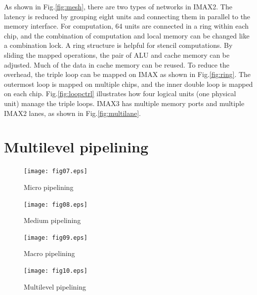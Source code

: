 As shown in Fig.\ref{fig:mesh}, there are two types of networks in
IMAX2. The latency is reduced by grouping eight units and connecting them in
parallel to the memory interface. For computation, 64 units are connected in
a ring within each chip, and the combination of computation and local memory
can be changed like a combination lock.  A ring structure is helpful for
stencil computations. By sliding the mapped operations, the pair of ALU and
cache memory can be adjusted. Much of the data in cache memory can be
reused.  To reduce the overhead, the triple loop can be mapped on IMAX as
shown in Fig.\ref{fig:ring}. The outermost loop is mapped on multiple chips,
and the inner double loop is mapped on each chip. Fig.\ref{fig:loopctrl}
illustrates how four logical units (one physical unit) manage the triple
loops. IMAX3 has multiple memory ports and multiple IMAX2 lanes, as shown
in Fig.\ref{fig:multilane}.

\section{Multilevel pipelining}

\begin{figure}[htbp]
\center
\texttt{[image: fig07.eps]}
\caption{\label{fig:micro}Micro pipelining}
\end{figure}

\begin{figure}[htbp]
\center
\texttt{[image: fig08.eps]}
\caption{\label{fig:medium}Medium pipelining}
\end{figure}

\begin{figure}[htbp]
\center
\texttt{[image: fig09.eps]}
\caption{\label{fig:macro}Macro pipelining}
\end{figure}

\begin{figure}[htbp]
\center
\texttt{[image: fig10.eps]}
\caption{\label{fig:all}Multilevel pipelining}
\end{figure}

